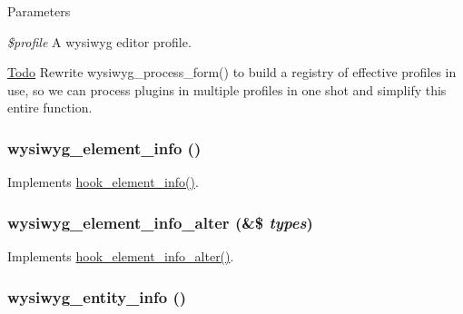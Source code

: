\begin{DoxyParams}{Parameters}
\item[{\em \$profile}]A wysiwyg editor profile.\end{DoxyParams}
\begin{Desc}
\item[\hyperlink{todo__todo000093}{Todo}]Rewrite wysiwyg\_\-process\_\-form() to build a registry of effective profiles in use, so we can process plugins in multiple profiles in one shot and simplify this entire function. \end{Desc}
\hypertarget{wysiwyg_8module_a558b7da961229a8d501fa8581d802093}{
\subsubsection[{wysiwyg\_\-element\_\-info}]{\setlength{\rightskip}{0pt plus 5cm}wysiwyg\_\-element\_\-info ()}}
\label{wysiwyg_8module_a558b7da961229a8d501fa8581d802093}
Implements \hyperlink{group__hooks_ga3c5182432eddc82f8b7845e66a365d51}{hook\_\-element\_\-info()}. \hypertarget{wysiwyg_8module_aa482dbbc6100de3682a8deb035a03ed5}{
\subsubsection[{wysiwyg\_\-element\_\-info\_\-alter}]{\setlength{\rightskip}{0pt plus 5cm}wysiwyg\_\-element\_\-info\_\-alter (\&\$ {\em types})}}
\label{wysiwyg_8module_aa482dbbc6100de3682a8deb035a03ed5}
Implements \hyperlink{group__hooks_gaf83b34170f31d93a7cfed56afa60007a}{hook\_\-element\_\-info\_\-alter()}. \hypertarget{wysiwyg_8module_abb82c2196b81d43dfdfe589eaf10a410}{
\subsubsection[{wysiwyg\_\-entity\_\-info}]{\setlength{\rightskip}{0pt plus 5cm}wysiwyg\_\-entity\_\-info ()}}
\label{wysiwyg_8module_abb82c2196b81d43dfdfe589eaf10a410}
